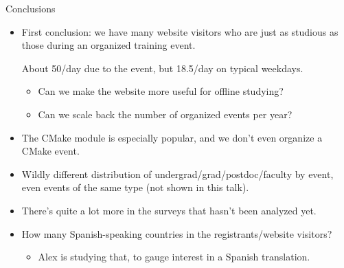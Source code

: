 \documentclass[aspectratio=169]{beamer}
\begin{document}
\begin{frame}{Conclusions}
\large
\vspace{0.35 cm}
\begin{itemize}\setlength{\itemsep}{0.25 cm}
\item<1-> First conclusion: we have many website visitors who are just as studious as those during an organized training event.

\vspace{0.25 cm}
About 50/day due to the event, but 18.5/day on typical weekdays.

\vspace{0.25 cm}
\begin{itemize}\large
\item<2-> \large Can we make the website more useful for offline studying?
\item<3-> \large Can we scale back the number of organized events per year?
\end{itemize}
\item<4-> The CMake module is especially popular, and we don't even organize a CMake event.
\item<5-> Wildly different distribution of undergrad/grad/postdoc/faculty by event, even events of the same type (not shown in this talk).
\item<6-> There's quite a lot more in the surveys that hasn't been analyzed yet.
\item<7-> How many Spanish-speaking countries in the registrants/website visitors?
\vspace{0.15 cm}
\begin{itemize}\large
\item \large Alex is studying that, to gauge interest in a Spanish translation.
\end{itemize}
\end{itemize}
\end{frame}
\end{document}
